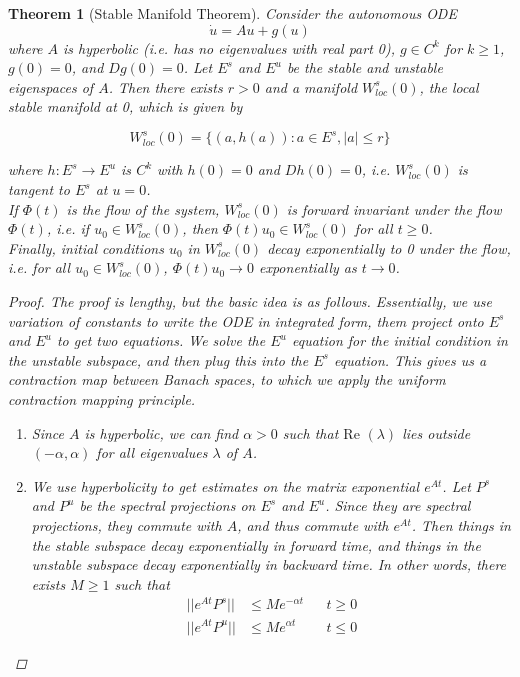 \documentclass{article}
\newtheorem{theorem}{Theorem}[section]
\begin{document}
\begin{theorem}[Stable Manifold Theorem]
Consider the autonomous ODE
\begin{equation}
\dot{u} = Au + g(u)
\end{equation}
where $A$ is hyperbolic (i.e. has no eigenvalues with real part 0), $g \in C^k$ for $k \geq 1$, $g(0) = 0$, and $Dg(0) = 0$. Let $E^s$ and $E^u$ be the stable and unstable eigenspaces of $A$. Then there exists $r > 0$ and a manifold $W^s_{loc}(0)$, the local stable manifold at 0, which is given by

\[
W^s_{loc}(0) = \{ (a, h(a)) : a \in E^s, |a| \leq r \}
\]

where $h: E^s \rightarrow E^u$ is $C^k$ with $h(0) = 0$ and $Dh(0) = 0$, i.e. $W^s_{loc}(0)$ is tangent to $E^s$ at $u = 0$.\\

If $\Phi(t)$ is the flow of the system, $W^s_{loc}(0)$ is forward invariant under the flow $\Phi(t)$, i.e. if $u_0 \in W^s_{loc}(0)$, then $\Phi(t)u_0 \in W^s_{loc}(0)$ for all $t \geq 0$. \\

Finally, initial conditions $u_0$ in $W^s_{loc}(0)$ decay exponentially to 0 under the flow, i.e. for all $u_0 \in W^s_{loc}(0)$, $\Phi(t)u_0 \rightarrow 0$ exponentially as $t \rightarrow 0$.

\begin{proof}
The proof is lengthy, but the basic idea is as follows. Essentially, we use variation of constants to write the ODE in integrated form, them project onto $E^s$ and $E^u$ to get two equations. We solve the $E^u$ equation for the initial condition in the unstable subspace, and then plug this into the $E^s$ equation. This gives us a contraction map between Banach spaces, to which we apply the uniform contraction mapping principle. 

\begin{enumerate}
\item Since $A$ is hyperbolic, we can find $\alpha > 0$ such that $\text{Re }(\lambda)$ lies outside $(-\alpha, \alpha)$ for all eigenvalues $\lambda$ of $A$.

\item We use hyperbolicity to get estimates on the matrix exponential $e^{At}$. Let $P^s$ and $P^u$ be the spectral projections on $E^s$ and $E^u$. Since they are spectral projections, they commute with $A$, and thus commute with $e^{At}$. Then things in the stable subspace decay exponentially in forward time, and things in the unstable subspace decay exponentially in backward time. In other words, there exists $M \geq 1$ such that
\begin{align*}
||e^{At} P^s || &\leq M e^{-\alpha t} && t \geq 0 \\
||e^{At} P^u || &\leq M e^{\alpha t} && t \leq 0
\end{align*}


\end{enumerate}
\end{proof}
\end{theorem}
\end{document}
